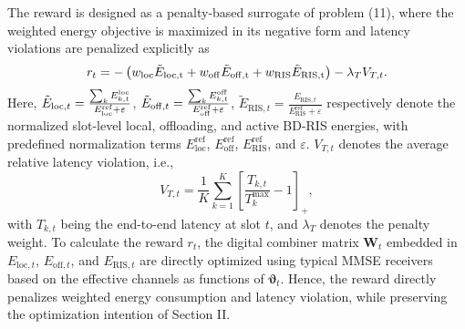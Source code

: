 \documentclass[conference]{IEEEtran}
\begin{document}
The reward is designed as a penalty-based surrogate of problem (11), where the 
weighted energy objective is maximized in its negative form and latency violations 
are penalized explicitly as
\[
r_t=-
\left(
w_{\rm loc}\tilde{E}_{\rm loc,t}
+w_{\rm off}\tilde{E}_{\rm off,t}
+w_{\rm RIS}\tilde{E}_{\rm RIS,t}
\right)
-\lambda_T V_{T,t}.
\]
Here, $\tilde E_{\mathrm{loc},t}=\frac{\sum_k E_{k,t}^{\rm loc}}{E_{\mathrm{loc}}^{\mathrm{ref}}+\varepsilon}$,
$\tilde E_{\mathrm{off},t}=\frac{\sum_k E_{k,t}^{\rm off}}{E_{\mathrm{off}}^{\mathrm{ref}}+\varepsilon}$,
$\tilde E_{\mathrm{RIS},t}=\frac{E_{\mathrm{RIS},t}}{E_{\mathrm{RIS}}^{\mathrm{ref}}+\varepsilon}$ respectively denote the normalized slot-level local, offloading, and active BD-RIS energies,
with predefined normalization terms $E_{\mathrm{loc}}^{\mathrm{ref}}$, $E_{\mathrm{off}}^{\mathrm{ref}}$, $E_{\mathrm{RIS}}^{\mathrm{ref}}$, and $\varepsilon$. $V_{T,t}$ denotes the average relative latency violation, i.e.,
\begin{equation}
V_{T,t}
=
\frac{1}{K}\sum_{k=1}^{K}
\left[
\frac{T_{k,t}}{T_k^{\max}}-1
\right]_+,
\label{eq:vt}
\end{equation}
with $T_{k,t}$ being the end-to-end latency at slot $t$, and $\lambda_T$ denotes the penalty weight. 
To calculate the reward $r_t$, the digital combiner matrix $\mathbf{W}_t$ embedded in $E_{\mathrm{loc},t}$, $E_{\mathrm{off},t}$, and $E_{\mathrm{RIS},t}$ are directly optimized using typical MMSE receivers based on the effective channels as functions of $\boldsymbol{\vartheta}_t$.  
Hence, the reward directly penalizes weighted energy consumption and latency violation, while preserving the optimization intention of Section II.
\end{document}
